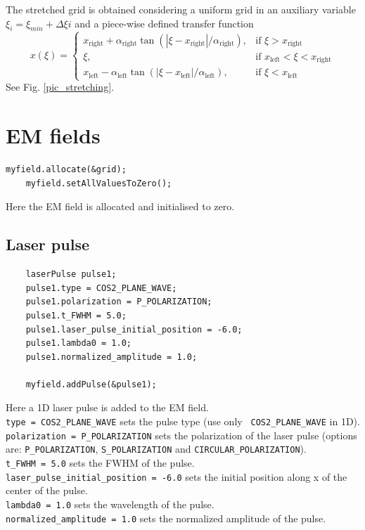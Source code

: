 \documentclass[11pt,a4paper]{report}
\begin{document}
The stretched grid is obtained considering a uniform grid in an 
auxiliary variable $\xi_i=\xi_{min}+\Delta\xi i$ and a piece-wise defined transfer function
$$
x(\xi) =
\begin{cases}
x_{\text{right}}+\alpha_{\text{right}} \tan\left(
\left|\xi-x_{\text{right}}\right|/\alpha_{\text{right}}\right), & \text{if } \xi>x_{\text{right}}\\
\xi, & \text{if }x_{\text{left}}<\xi<x_{\text{right}}\\
x_{\text{left}}-\alpha_{\text{left}} \tan\left(
\left|\xi-x_{\text{left}}\right|/\alpha_{\text{left}}\right), & \text{if } \xi<x_{\text{left}}
\end{cases}
$$
See Fig. \ref{pic_stretching}.


\section{EM fields}
\begin{lstlisting}[backgroundcolor=\color{no_modify}]
	myfield.allocate(&grid);
	myfield.setAllValuesToZero();
\end{lstlisting}
Here the EM field is allocated and initialised to zero.
\subsection{Laser pulse}

\begin{lstlisting}
	laserPulse pulse1;
	pulse1.type = COS2_PLANE_WAVE;
	pulse1.polarization = P_POLARIZATION;
	pulse1.t_FWHM = 5.0;
	pulse1.laser_pulse_initial_position = -6.0;
	pulse1.lambda0 = 1.0;
	pulse1.normalized_amplitude = 1.0;

	myfield.addPulse(&pulse1);
\end{lstlisting}
Here a 1D laser pulse is added to the EM field. \\
\verb+type = COS2_PLANE_WAVE+ sets the pulse type (use only \verb+ COS2_PLANE_WAVE+ in 1D).\\
\verb+polarization = P_POLARIZATION+ sets the polarization of the laser pulse (options are: \texttt{P\_POLARIZATION}, \texttt{S\_POLARIZATION} and \texttt{CIRCULAR\_POLARIZATION}).\\
\verb+t_FWHM = 5.0+ sets the FWHM of the pulse.\\
\verb+laser_pulse_initial_position = -6.0+ sets the initial position along x of the center of the pulse.\\
\verb+lambda0 = 1.0+ sets the wavelength of the pulse.\\
\verb+normalized_amplitude = 1.0+ sets the normalized amplitude of the pulse.\\
\end{document}
